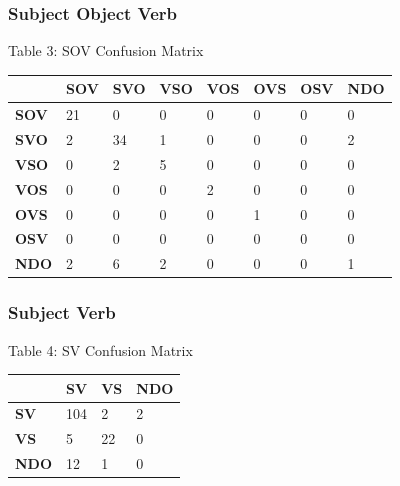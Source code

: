 \documentclass[]{aiaa-tc}
\begin{document}
\subsubsection{Subject Object Verb}
\begin{center}
Table 3: SOV Confusion Matrix
\end{center}
\begin{flushleft}
\begin{tabularx}{\textwidth}{|X|X|X|X|X|X|X|X|}
\hline
& \textbf{SOV} & \textbf{SVO} & \textbf{VSO} & \textbf{VOS} & \textbf{OVS} & \textbf{OSV} & \textbf{NDO} \\ \hline
\textbf{SOV} & 21  & 0   & 0   & 0   & 0   & 0   & 0  \\ \hline
\textbf{SVO} & 2   & 34  & 1   & 0   & 0   & 0   & 2  \\ \hline
\textbf{VSO} & 0   & 2   & 5   & 0   & 0   & 0   & 0  \\ \hline
\textbf{VOS} & 0   & 0   & 0   & 2   & 0   & 0   & 0  \\ \hline
\textbf{OVS} & 0   & 0   & 0   & 0   & 1   & 0   & 0  \\ \hline
\textbf{OSV} & 0   & 0   & 0   & 0   & 0   & 0   & 0  \\ \hline
\textbf{NDO} & 2   & 6   & 2   & 0   & 0   & 0   & 1  \\ \hline
\end{tabularx}
\end{flushleft}
\vspace{0.6cm}

\subsubsection{Subject Verb}
\begin{center}
Table 4: SV Confusion Matrix
\end{center}
\begin{flushleft}
\begin{tabularx}{\textwidth}{|X|X|X|X|}
\hline
& \textbf{SV} & \textbf{VS} & \textbf{NDO} \\ \hline
\textbf{SV} & 104  & 2   & 2   \\ \hline
\textbf{VS} & 5   & 22  & 0   \\ \hline
\textbf{NDO} & 12   & 1   & 0   \\ \hline
\hline
\end{tabularx}
\end{flushleft}
\vspace{0.6cm}
\end{document}
